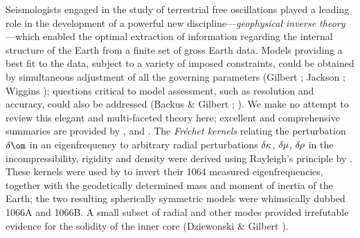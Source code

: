 Seismologists engaged in the study of terrestrial free oscillations
played a leading role in the development of a powerful new
discipline---{\em geophysical inverse theory\/}---which enabled
%
%
the optimal extraction of information regarding
the internal structure of the Earth from a finite
set of gross Earth data.  Models providing a best fit
to the data, subject to a variety of imposed constraints,
could be obtained by simultaneous adjustment of all the
governing parameters (Gilbert \citeyear{gilbert71b};
Jackson \citeyear{jackson72}; Wiggins \citeyear{wiggins72});
questions critical to model assessment, such as resolution and accuracy,
could also be addressed (Backus \& Gilbert \citeyear{backus&gilbert68};
\citeyear{backus&gilbert70}).  We make no attempt to
review this elegant and multi-faceted theory here;
excellent and comprehensive summaries are provided by
\textcite{menke84}, \textcite{tarantola87} and \textcite{parker94}.
The {\em Fr\'{e}chet kernels\/}
%
relating the perturbation
$\delta\om$ in an eigenfrequency to arbitrary radial
perturbations $\delta\hspace{-0.1 mm}\kappa$,
$\delta\hspace{-0.1 mm}\mu$, $\delta\hspace{-0.2 mm}\rho$
in the incompressibility, rigidity and density were derived
using Rayleigh's principle by \textcite{backus&gilbert67}.
These kernels were used by \textcite{gilbert&dziewonski75}
to invert their 1064 measured eigenfrequencies,
together with the geodetically determined mass
and moment of inertia of the Earth; the two resulting
spherically symmetric models were whimsically dubbed
1066A and 1066B.  A small subset of radial and other
modes provided irrefutable evidence for the solidity
of the inner core (Dziewonski \& Gilbert \citeyear{dziewonski&gilbert71}).

